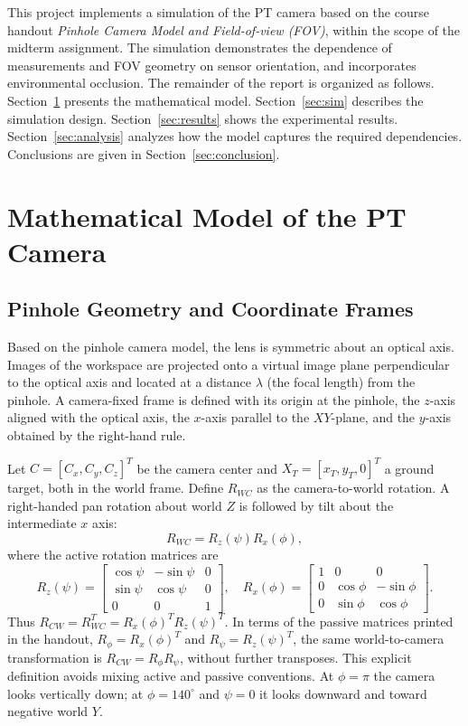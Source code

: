 \documentclass[11pt,letterpaper]{article}
\begin{document}
This project implements a simulation of the PT camera based on the course handout \textit{Pinhole Camera Model and Field-of-view (FOV)}\cite{handout}, within the scope of the midterm assignment\cite{midterm}. The simulation demonstrates the dependence of measurements and FOV geometry on sensor orientation, and incorporates environmental occlusion. The remainder of the report is organized as follows. Section~\ref{sec:model} presents the mathematical model. Section~\ref{sec:sim} describes the simulation design. Section~\ref{sec:results} shows the experimental results. Section~\ref{sec:analysis} analyzes how the model captures the required dependencies. Conclusions are given in Section~\ref{sec:conclusion}.

\section{Mathematical Model of the PT Camera}
\label{sec:model}

\subsection{Pinhole Geometry and Coordinate Frames}
Based on the pinhole camera model, the lens is symmetric about an optical axis. Images of the workspace are projected onto a virtual image plane perpendicular to the optical axis and located at a distance $\lambda$ (the focal length) from the pinhole. A camera-fixed frame is defined with its origin at the pinhole, the $z$-axis aligned with the optical axis, the $x$-axis parallel to the $XY$-plane, and the $y$-axis obtained by the right-hand rule.

Let $C=[C_x,C_y,C_z]^T$ be the camera center and $X_T=[x_T,y_T,0]^T$ a ground target, both in the world frame. Define $R_{WC}$ as the camera-to-world rotation. A right-handed pan rotation about world $Z$ is followed by tilt about the intermediate $x$ axis:
\begin{equation}
R_{WC}=R_z(\psi)R_x(\phi),
\label{eq:rotation}
\end{equation}
where the active rotation matrices are
\begin{equation}
R_z(\psi)=\begin{bmatrix}
\cos\psi&-\sin\psi&0\\\sin\psi&\cos\psi&0\\0&0&1
\end{bmatrix},\quad
R_x(\phi)=\begin{bmatrix}
1&0&0\\0&\cos\phi&-\sin\phi\\0&\sin\phi&\cos\phi
\end{bmatrix}.
\end{equation}
Thus $R_{CW}=R_{WC}^T=R_x(\phi)^TR_z(\psi)^T$. In terms of the passive matrices printed in the handout, $R_\phi=R_x(\phi)^T$ and $R_\psi=R_z(\psi)^T$, the same world-to-camera transformation is $R_{CW}=R_\phi R_\psi$, without further transposes. This explicit definition avoids mixing active and passive conventions. At $\phi=\pi$ the camera looks vertically down; at $\phi=140^\circ$ and $\psi=0$ it looks downward and toward negative world $Y$.
\end{document}

